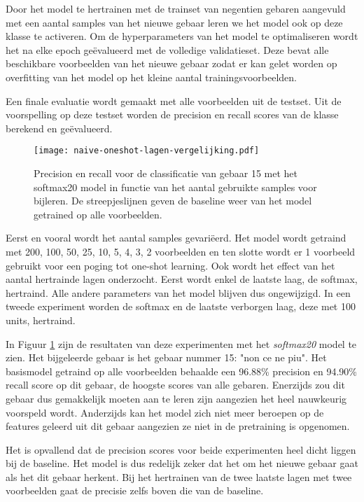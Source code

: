 \npar Door het model te hertrainen met de trainset van negentien gebaren aangevuld met een aantal samples van het nieuwe gebaar leren we het model ook op deze klasse te activeren. Om de hyperparameters van het model te optimaliseren wordt het na elke epoch ge\"evalueerd met de volledige validatieset. Deze bevat alle beschikbare voorbeelden van het nieuwe gebaar zodat er kan gelet worden op overfitting van het model op het kleine aantal trainingsvoorbeelden.

\npar Een finale evaluatie wordt gemaakt met alle voorbeelden uit de testset. Uit de voorspelling op deze testset worden de precision en recall scores van de klasse berekend en ge\"evalueerd.

\begin{figure}
	\centering
	\texttt{[image: naive-oneshot-lagen-vergelijking.pdf]}
	\caption{Precision en recall voor de classificatie van gebaar 15 met het softmax20 model in functie van het aantal gebruikte samples voor bijleren. De streepjeslijnen geven de baseline weer van het model getrained op alle voorbeelden.}\label{fig:naive-model}
\end{figure}

\npar Eerst en vooral wordt het aantal samples gevari\"eerd. Het model wordt getraind met 200, 100, 50, 25, 10, 5, 4, 3, 2 voorbeelden en ten slotte wordt er 1 voorbeeld gebruikt voor een poging tot one-shot learning.
\npar Ook wordt het effect van het aantal hertrainde lagen onderzocht. Eerst wordt enkel de laatste laag, de softmax, hertraind. Alle andere parameters van het model blijven dus ongewijzigd. In een tweede experiment worden de softmax en de laatste verborgen laag, deze met 100 units, hertraind.

\npar In Figuur \ref{fig:naive-model} zijn de resultaten van deze experimenten met het \textit{softmax20} model te zien. Het bijgeleerde gebaar is het gebaar nummer 15: "non ce ne piu". Het basismodel getraind op alle voorbeelden behaalde een 96.88\% precision en 94.90\% recall score op dit gebaar, de hoogste scores van alle gebaren. Enerzijds zou dit gebaar dus gemakkelijk moeten aan te leren zijn aangezien het heel nauwkeurig voorspeld wordt. Anderzijds kan het model zich niet meer beroepen op de features geleerd uit dit gebaar aangezien ze niet in de pretraining is opgenomen.

\npar Het is opvallend dat de precision scores voor beide experimenten heel dicht liggen bij de baseline. Het model is dus redelijk zeker dat het om het nieuwe gebaar gaat als het dit gebaar herkent. Bij het hertrainen van de twee laatste lagen met twee voorbeelden gaat de precisie zelfs boven die van de baseline.

